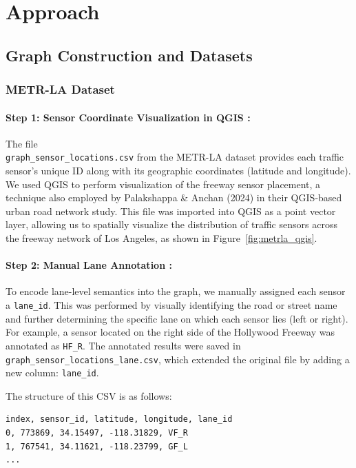 \documentclass[runningheads]{llncs}
\begin{document}
\section{Approach}

\subsection{Graph Construction and Datasets}

\subsubsection{METR-LA Dataset}

\paragraph{Step 1: Sensor Coordinate Visualization in QGIS \cite{QGIS} : }
The file \\ \texttt{graph\_sensor\_locations.csv} from the METR-LA dataset provides each traffic sensor’s unique ID along with its geographic coordinates (latitude and longitude). We used QGIS to perform visualization of the freeway sensor placement, a technique also employed by Palakshappa & Anchan (2024) \cite{palakshappa2024qgis} in their QGIS‑based urban road network study. This file was imported into QGIS as a point vector layer, allowing us to spatially visualize the distribution of traffic sensors across the freeway network of Los Angeles, as shown in Figure~\ref{fig:metrla_qgis}.

\paragraph{Step 2: Manual Lane Annotation : }
To encode lane-level semantics into the graph, we manually assigned each sensor a \texttt{lane\_id}. This was performed by visually identifying the road or street name and further determining the specific lane on which each sensor lies (left or right). For example, a sensor located on the right side of the Hollywood Freeway was annotated as \texttt{HF\_R}. The annotated results were saved in \texttt{graph\_sensor\_locations\_lane.csv}, which extended the original file by adding a new column: \texttt{lane\_id}.

\noindent The structure of this CSV is as follows:
\begin{verbatim}
index, sensor_id, latitude, longitude, lane_id
0, 773869, 34.15497, -118.31829, VF_R
1, 767541, 34.11621, -118.23799, GF_L
...
\end{verbatim}
\end{document}
